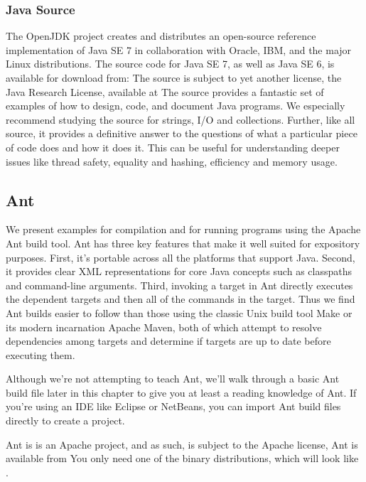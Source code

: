 \subsubsection{Java Source}

The OpenJDK project creates and distributes an open-source reference
implementation of Java SE 7 in collaboration with Oracle, IBM, and
the major Linux distributions.  The source code for Java SE 7,
as well as Java SE 6,  is available for download from:
%
%
The source is subject to yet another license, the Java Research License,
available at
%
%
The source provides a fantastic set of examples of how to design,
code, and document Java programs.  We especially recommend studying
the source for strings, I/O and collections.  Further, like all
source, it provides a definitive answer to the questions of what a
particular piece of code does and how it does it.  This can be useful
for understanding deeper issues like thread safety, equality and
hashing, efficiency and memory usage.


\subsection{Ant}

We present examples for compilation and for running programs
using the Apache Ant build tool.  Ant has three key features that make
it well suited for expository purposes.  First, it's portable across
all the platforms that support Java.  Second, it provides clear XML
representations for core Java concepts such as classpaths and
command-line arguments.  Third, invoking a target in Ant directly
executes the dependent targets and then all of the commands in the
target.  Thus we find Ant builds easier to follow than those using the
classic Unix build tool Make or its modern incarnation Apache Maven, both
of which attempt to resolve dependencies among targets and determine
if targets are up to date before executing them.

Although we're not attempting to teach Ant, we'll walk through a basic
Ant build file later in this chapter to give you at least a reading
knowledge of Ant.  If you're using an IDE like Eclipse or NetBeans,
you can import Ant build files directly to create a project.

Ant is is an Apache project, and as such, is subject to the Apache license,
%
%
Ant is available from 
%
%
You only need one of the binary distributions, which will
look like .


